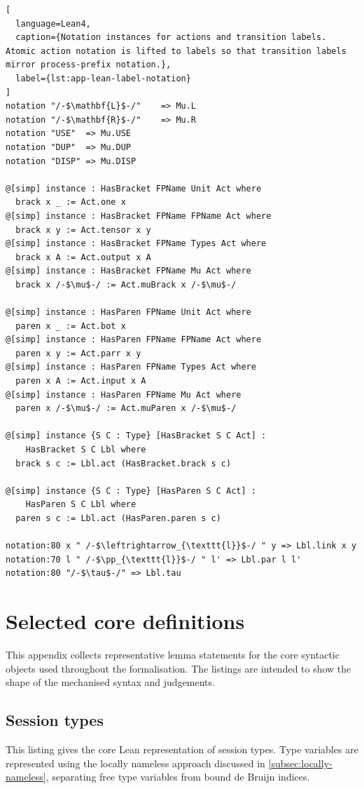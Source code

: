 \begin{lstlisting}[
  language=Lean4,
  caption={Notation instances for actions and transition labels. Atomic action notation is lifted to labels so that transition labels mirror process-prefix notation.},
  label={lst:app-lean-label-notation}
]
notation "/-$\mathbf{L}$-/"    => Mu.L
notation "/-$\mathbf{R}$-/"    => Mu.R
notation "USE"  => Mu.USE
notation "DUP"  => Mu.DUP
notation "DISP" => Mu.DISP

@[simp] instance : HasBracket FPName Unit Act where
  brack x _ := Act.one x
@[simp] instance : HasBracket FPName FPName Act where
  brack x y := Act.tensor x y
@[simp] instance : HasBracket FPName Types Act where
  brack x A := Act.output x A
@[simp] instance : HasBracket FPName Mu Act where
  brack x /-$\mu$-/ := Act.muBrack x /-$\mu$-/

@[simp] instance : HasParen FPName Unit Act where
  paren x _ := Act.bot x
@[simp] instance : HasParen FPName FPName Act where
  paren x y := Act.parr x y
@[simp] instance : HasParen FPName Types Act where
  paren x A := Act.input x A
@[simp] instance : HasParen FPName Mu Act where
  paren x /-$\mu$-/ := Act.muParen x /-$\mu$-/

@[simp] instance {S C : Type} [HasBracket S C Act] :
    HasBracket S C Lbl where
  brack s c := Lbl.act (HasBracket.brack s c)

@[simp] instance {S C : Type} [HasParen S C Act] :
    HasParen S C Lbl where
  paren s c := Lbl.act (HasParen.paren s c)

notation:80 x " /-$\leftrightarrow_{\texttt{l}}$-/ " y => Lbl.link x y
notation:70 l " /-$\pp_{\texttt{l}}$-/ " l' => Lbl.par l l'
notation:80 "/-$\tau$-/" => Lbl.tau
\end{lstlisting}

\section{Selected core definitions}\label{app:selected-core-definitions}
This appendix collects representative lemma statements for the core syntactic objects used throughout the formalisation. The listings are intended to show the shape of the mechanised syntax and judgements.

\subsection{Session types}\label{app:session-types}
This listing gives the core Lean representation of session types. Type variables are represented using the locally nameless approach discussed in \cref{subsec:locally-nameless}, separating free type variables from bound de Bruijn indices.

